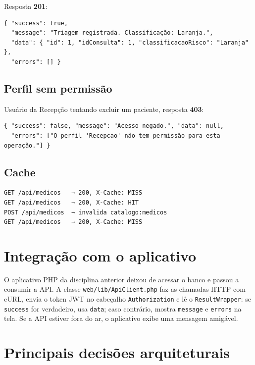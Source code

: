 \documentclass[12pt,a4paper]{article}
\newcommand{\cod}[1]{\texttt{#1}}
\begin{document}
Resposta \textbf{201}:
\begin{lstlisting}
{ "success": true,
  "message": "Triagem registrada. Classificação: Laranja.",
  "data": { "id": 1, "idConsulta": 1, "classificacaoRisco": "Laranja" },
  "errors": [] }
\end{lstlisting}

\subsection{Perfil sem permissão}

Usuário da Recepção tentando excluir um paciente, resposta \textbf{403}:
\begin{lstlisting}
{ "success": false, "message": "Acesso negado.", "data": null,
  "errors": ["O perfil 'Recepcao' não tem permissão para esta operação."] }
\end{lstlisting}

\subsection{Cache}

\begin{lstlisting}
GET /api/medicos   → 200, X-Cache: MISS
GET /api/medicos   → 200, X-Cache: HIT
POST /api/medicos  → invalida catalogo:medicos
GET /api/medicos   → 200, X-Cache: MISS
\end{lstlisting}

\section{Integração com o aplicativo}

O aplicativo PHP da disciplina anterior deixou de acessar o banco e passou a consumir a API.
A classe \cod{web/lib/ApiClient.php} faz as chamadas HTTP com cURL, envia o token JWT no
cabeçalho \cod{Authorization} e lê o \cod{ResultWrapper}: se \cod{success} for verdadeiro, usa
\cod{data}; caso contrário, mostra \cod{message} e \cod{errors} na tela. Se a API estiver fora do
ar, o aplicativo exibe uma mensagem amigável.

\section{Principais decisões arquiteturais}
\end{document}
